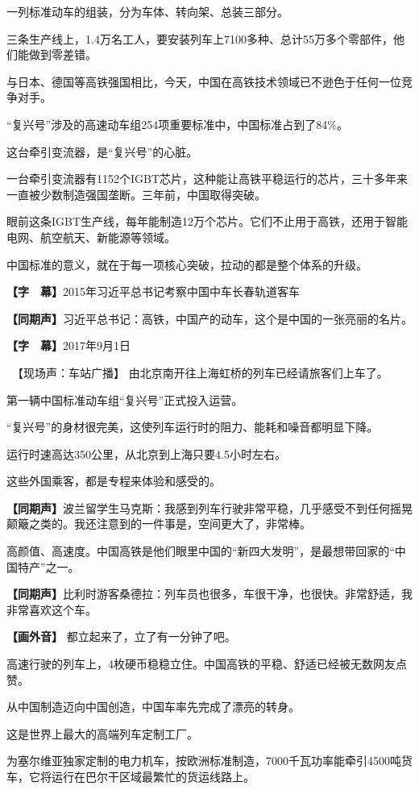 \documentclass{ctexart}
\newcommand{\zkh}[1]{\textbf{\hspace{-2.7em} 【#1】}}
\begin{document}
 一列标准动车的组装，分为车体、转向架、总装三部分。

三条生产线上，1.4万名工人，要安装列车上7100多种、总计55万多个零部件，他们能做到零差错。

与日本、德国等高铁强国相比，今天，中国在高铁技术领域已不逊色于任何一位竞争对手。

 ``复兴号''涉及的高速动车组254项重要标准中，中国标准占到了84{\%}。

 这台牵引变流器，是``复兴号''的心脏。

一台牵引变流器有1152个IGBT芯片，这种能让高铁平稳运行的芯片，三十多年来一直被少数制造强国垄断。三年前，中国取得突破。

眼前这条IGBT生产线，每年能制造12万个芯片。它们不止用于高铁，还用于智能电网、航空航天、新能源等领域。

 中国标准的意义，就在于每一项核心突破，拉动的都是整个体系的升级。

 \zkh{字　幕}2015年习近平总书记考察中国中车长春轨道客车

 \zkh{同期声}习近平总书记：高铁，中国产的动车，这个是中国的一张亮丽的名片。

 \zkh{字　幕}2017年9月1日

 　【现场声：车站广播】 由北京南开往上海虹桥的列车已经请旅客们上车了。

 第一辆中国标准动车组``复兴号''正式投入运营。

 ``复兴号''的身材很完美，这使列车运行时的阻力、能耗和噪音都明显下降。

 运行时速高达350公里，从北京到上海只要4.5小时左右。

 这些外国乘客，都是专程来体验和感受的。

\zkh{同期声}波兰留学生马克斯：我感到列车行驶非常平稳，几乎感受不到任何摇晃颠簸之类的。我还注意到的一件事是，空间更大了，非常棒。

 
高颜值、高速度。中国高铁是他们眼里中国的``新四大发明''，是最想带回家的``中国特产''之一。

\zkh{同期声}比利时游客桑德拉：列车员也很多，车很干净，也很快。非常舒适，我非常喜欢这个车。

 \zkh{画外音} 都立起来了，立了有一分钟了吧。

 
高速行驶的列车上，4枚硬币稳稳立住。中国高铁的平稳、舒适已经被无数网友点赞。

 从中国制造迈向中国创造，中国车率先完成了漂亮的转身。

 这是世界上最大的高端列车定制工厂。

为塞尔维亚独家定制的电力机车，按欧洲标准制造，7000千瓦功率能牵引4500吨货车，它将运行在巴尔干区域最繁忙的货运线路上。
\end{document}
